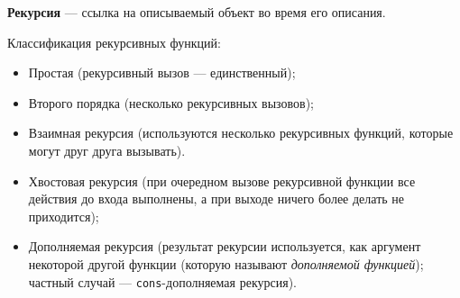 \textbf{Рекурсия} --- ссылка на описываемый объект во время его описания.

Классификация рекурсивных функций:
\begin{itemize}
    \item Простая (рекурсивный вызов --- единственный);
    \item Второго порядка (несколько рекурсивных вызовов);
    \item Взаимная рекурсия (используются несколько рекурсивных функций, которые могут друг друга вызывать).
    \item Хвостовая рекурсия (при очередном вызове рекурсивной функции все действия до входа выполнены, а при выходе ничего более делать не приходится);
    \item Дополняемая рекурсия (результат рекурсии используется, как аргумент некоторой другой функции (которую называют \textit{дополняемой функцией}); частный случай --- \texttt{cons}-дополняемая рекурсия).
\end{itemize}


